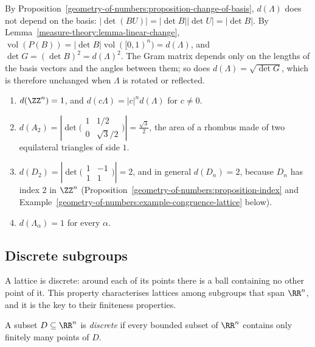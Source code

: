 By Proposition~\ref{geometry-of-numbers:proposition-change-of-basis}, $d(\Lambda)$ does not depend on the basis: $|\det(BU)| = |\det B||\det U| = |\det B|$. By
Lemma~\ref{measure-theory:lemma-linear-change}, $\operatorname{vol}(P(B)) = |\det B|\operatorname{vol}([0, 1)^n) = d(\Lambda)$, and $\det G = (\det B)^2 = d(\Lambda)^2$. The Gram matrix
depends only on the lengths of the basis vectors and the angles between them; so does $d(\Lambda) = \sqrt{\det G}$, which is therefore unchanged when $\Lambda$ is rotated or reflected.

\begin{example}\label{geometry-of-numbers:example-covolumes}
\begin{enumerate}
\item $d(\ZZ^n) = 1$, and $d(c\Lambda) = |c|^nd(\Lambda)$ for $c \neq 0$.
\item $d(A_2) = |\det\bigl(\begin{smallmatrix}1 & 1/2\\ 0 & \sqrt3/2\end{smallmatrix}\bigr)| = \frac{\sqrt3}{2}$, the area of a rhombus made of two equilateral triangles of side $1$.
\item $d(D_2) = |\det\bigl(\begin{smallmatrix}1 & -1\\ 1 & 1\end{smallmatrix}\bigr)| = 2$, and in general $d(D_n) = 2$, because $D_n$ has index $2$ in $\ZZ^n$
(Proposition~\ref{geometry-of-numbers:proposition-index} and Example~\ref{geometry-of-numbers:example-congruence-lattice} below).
\item $d(\Lambda_\alpha) = 1$ for every $\alpha$.
\end{enumerate}
\end{example}

\subsection{Discrete subgroups}\label{geometry-of-numbers:subsection-discrete}

A lattice is discrete: around each of its points there is a ball containing no other point of it. This property characterises lattices among subgroups that span $\RR^n$, and it is the key to
their finiteness properties.

\begin{definition}\label{geometry-of-numbers:definition-discrete}
A subset $D \subseteq \RR^n$ is \emph{discrete} if every bounded subset of $\RR^n$ contains only finitely many points of $D$.
\end{definition}

